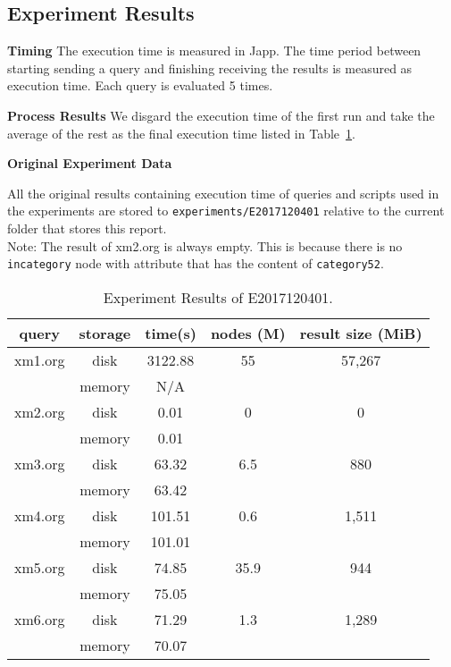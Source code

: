 \subsection{Experiment Results}

\textbf{Timing} The execution time is measured in Japp. The time period between
starting sending a query and finishing receiving the results is measured as
execution time. Each query is evaluated 5 times.

\textbf{Process Results}
We disgard the execution time of the first run and take the average of the rest as
the final execution time listed in Table~\ref{table:E2017120401_1}.


\textbf{Original Experiment Data}

All the original results containing execution time of queries and scripts used
in the experiments  are stored to \texttt{experiments/E2017120401} relative to
the current folder that stores this report.\\

Note: The result of xm2.org is always empty. This is because there is no \texttt{incategory} node
with attribute that has the content of \texttt{category52}.


\begin{table}[t]
	\caption{Experiment Results of E2017120401.}
	\label{table:E2017120401_1}
	\centering
	\begin{tabular}{c|c|c|c|c}
		\hline \hline
		query  & storage & time(s)  &  nodes (M) &  result size (MiB)  \\
		\hline \hline
		xm1.org &  disk   & 3122.88  &  55 &  57,267  \\  %
		& memory  &    N/A   &  \\
		\hline
		xm2.org &  disk   &    0.01  &  0 &            0 \\
		& memory  &    0.01  &  \\
		\hline
		xm3.org &  disk   &  63.32  &  6.5 &  880 \\  %
		& memory  &  63.42  &  \\
		\hline
		xm4.org &  disk   &  101.51  & 0.6 & 1,511 \\ %
		& memory  &  101.01  &  \\
		\hline
		xm5.org &  disk   &  74.85  &  35.9 &  944 \\ %
		& memory  &  75.05   &   \\
		\hline
		xm6.org &  disk   &  71.29   &  1.3 & 1,289 \\ %
		& memory  &  70.07   &   \\
		\hline \hline
	\end{tabular}
\end{table}

